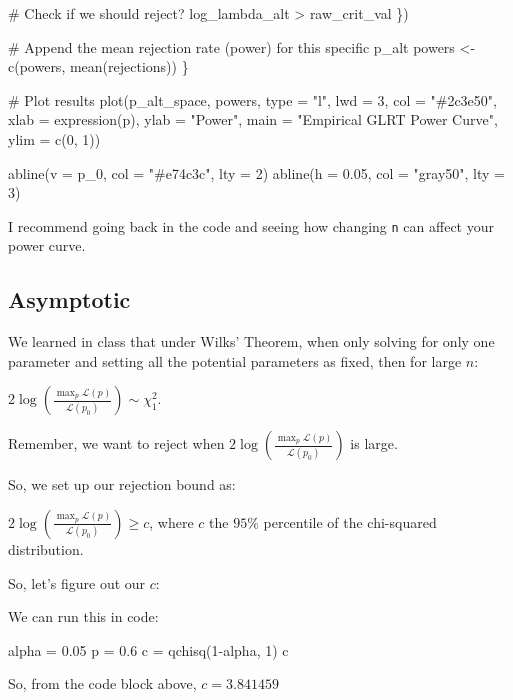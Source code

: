 \documentclass[
  letterpaper,
  DIV=11,
  numbers=noendperiod]{scrreprt}
\newenvironment{Shaded}{\begin{snugshade}}{\end{snugshade}}
\newcommand{\NormalTok}[1]{\textcolor[rgb]{0.00,0.23,0.31}{#1}}
\begin{document}
\begin{Shaded}
\begin{Highlighting}[]
\NormalTok{    \# Check if we should reject?}
\NormalTok{    log\_lambda\_alt \textgreater{} raw\_crit\_val}
\NormalTok{  \})}
  
\NormalTok{  \# Append the mean rejection rate (power) for this specific p\_alt}
\NormalTok{  powers \textless{}{-} c(powers, mean(rejections))}
\NormalTok{\}}

\NormalTok{\# Plot results}
\NormalTok{plot(p\_alt\_space, powers, type = "l", lwd = 3, col = "\#2c3e50",}
\NormalTok{     xlab = expression(p), ylab = "Power", }
\NormalTok{     main = "Empirical GLRT Power Curve", ylim = c(0, 1))}

\NormalTok{abline(v = p\_0, col = "\#e74c3c", lty = 2)  }
\NormalTok{abline(h = 0.05, col = "gray50", lty = 3) }
\end{Highlighting}
\end{Shaded}

I recommend going back in the code and seeing how changing \texttt{n}
can affect your power curve.

\subsection{Asymptotic}\label{asymptotic}

We learned in class that under Wilks' Theorem, when only solving for
only one parameter and setting all the potential parameters as fixed,
then for large \(n\):

\(2 \log(\frac{\max_{p} \mathcal{L}(p)}{\mathcal{L}(p_0)}) \sim \chi^2_1\).

Remember, we want to reject when
\(2 \log(\frac{\max_{p} \mathcal{L}(p)}{\mathcal{L}(p_0)})\) is large.

So, we set up our rejection bound as:

\(2 \log(\frac{\max_{p} \mathcal{L}(p)}{\mathcal{L}(p_0)}) \geq c\),
where \(c\) the \(95\%\) percentile of the chi-squared distribution.

So, let's figure out our \(c\):

We can run this in code:

\begin{Shaded}
\begin{Highlighting}[]
\NormalTok{alpha = 0.05}
\NormalTok{p = 0.6}
\NormalTok{c = qchisq(1{-}alpha, 1)}
\NormalTok{c}
\end{Highlighting}
\end{Shaded}

So, from the code block above, \(c = 3.841459\)
\end{document}
